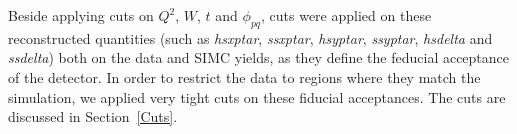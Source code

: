







Beside applying cuts on $Q^2$, $W$, $t$ and $\phi_{pq}$, cuts were applied on these reconstructed quantities (such as \textit{hsxptar}, \textit{ssxptar}, \textit{hsyptar}, \textit{ssyptar}, \textit{hsdelta} and \textit{ssdelta}) both on the data and SIMC yields, as they define the feducial acceptance of the detector. In order to restrict the data to regions where they match the simulation, we applied very tight cuts on these fiducial acceptances. The cuts are discussed in Section~\ref{Cuts}.

